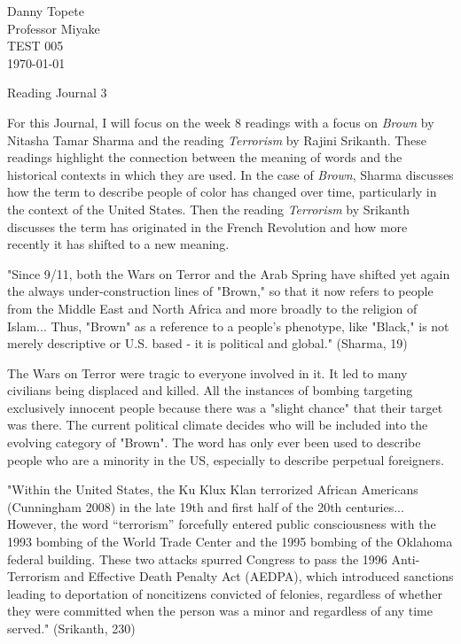 \documentclass[12pt]{article}
\begin{document}
\begin{flushleft}

Danny Topete\\
Professor Miyake\\
TEST 005\\
\today\\


\begin{center}
Reading Journal 3
\end{center}


\setlength{\parindent}{0.5in}

For this Journal, I will focus on the week 8 readings with a focus on \textit{Brown} by Nitasha Tamar Sharma
and the reading \textit{Terrorism} by Rajini Srikanth. These readings highlight the connection between
the meaning of words and the historical contexts in which they are used.
In the case of \textit{Brown}, Sharma discusses how the term
to describe people of color has changed over time, particularly in the context of the United States.
Then the reading \textit{Terrorism} by Srikanth discusses the term has originated in the French Revolution
and how more recently it has shifted to a new meaning.

"Since 9/11, both the Wars on Terror and the Arab Spring have shifted
yet again the always under-construction lines of "Brown," so that it now
refers to people from the Middle East and North Africa and more broadly to the religion of Islam...
Thus, "Brown" as a reference to a people's phenotype, like "Black," is not merely descriptive or U.S. based - it
is political and global." (Sharma, 19)

The Wars on Terror were tragic to everyone involved in it.
It led to many civilians being displaced and killed.
All the instances of bombing targeting exclusively innocent people
because there was a "slight chance" that their target was there.
The current political climate decides who will be included into the
evolving category of "Brown".
The word has only ever been used to describe people who are a minority in the US,
especially to describe perpetual foreigners.

"Within the United States, the Ku Klux Klan terrorized
African Americans (Cunningham 2008) in the late
19th and first half of the 20th centuries...
 However, the word “terrorism” forcefully
entered public consciousness with the 1993 bombing of
the World Trade Center and the 1995 bombing of the
Oklahoma federal building. These two attacks spurred
Congress to pass the 1996 Anti-Terrorism and Effective
Death Penalty Act (AEDPA), which introduced sanctions
leading to deportation of noncitizens convicted
of felonies, regardless of whether they were committed
when the person was a minor and regardless of any time
served." (Srikanth, 230)


\end{flushleft}
\end{document}

